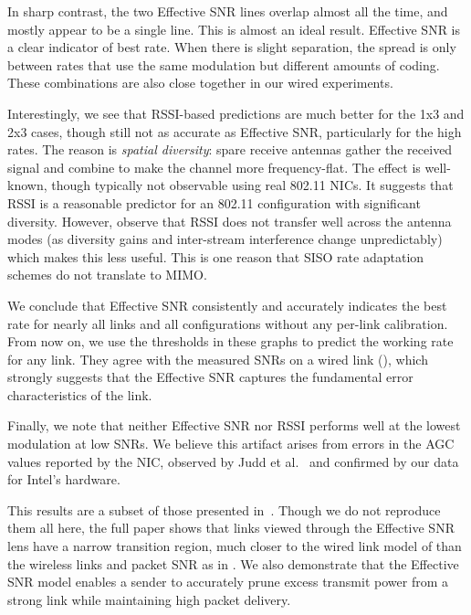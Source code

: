 In sharp contrast, %
the two Effective SNR lines overlap almost all the time, and mostly appear to be a single line. This is almost an ideal result. Effective SNR is a clear indicator of best rate. When there is slight separation, the spread is only between rates that use the same modulation but different amounts of coding. These combinations are also close together in our wired experiments. 

Interestingly, we see that RSSI-based predictions are much better for the 1x3 and 2x3 cases, though still not as accurate as Effective SNR, particularly for the high rates. The reason is \emph{spatial diversity}: spare receive antennas gather the received signal and combine to make the channel more frequency-flat. The effect is well-known, though typically not observable using real 802.11 NICs. It suggests that RSSI is a reasonable predictor for an 802.11 configuration with significant diversity. However, observe that RSSI does not transfer well across the antenna modes (as diversity gains and inter-stream interference change unpredictably) which makes this less useful. This is one reason that SISO rate adaptation schemes do not translate to MIMO\@.

We conclude that Effective SNR consistently and accurately indicates the best rate for nearly all links and all configurations without any per-link calibration. From now on, we use the thresholds in these graphs to predict the working rate for any link. They agree with the measured SNRs on a wired link (), which strongly suggests that the Effective SNR captures the fundamental error characteristics of the link. 

Finally, we note that neither Effective SNR nor RSSI performs well at the lowest modulation at low SNRs. We believe this artifact arises from errors in the AGC values reported by the NIC, observed by Judd et al.~\cite{Judd_CHARM} and confirmed by our data for Intel's hardware.

 This results are a subset of those presented in~\cite{Halperin_ESNR}. Though we do not reproduce them all here, the full paper shows that links viewed through the Effective SNR lens have a narrow transition region, much closer to the wired link model of  than the wireless links and packet SNR as in . We also demonstrate that the Effective SNR model enables a sender to accurately prune excess transmit power from a strong link while maintaining high packet delivery.

\ifx\mainfile\undefined

\fi
